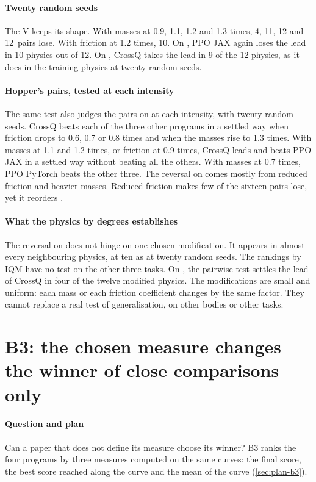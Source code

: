 \paragraph{Twenty random seeds}
The V keeps its shape. With masses at 0.9, 1.1, 1.2 and 1.3 times, 4, 11, 12 and 12~pairs lose. With friction
at 1.2 times, 10. On , PPO JAX again loses the lead in 10 physics out of 12. On
, CrossQ takes the lead in 9 of the 12 physics, as it does in the training physics at twenty
random seeds.

\paragraph{Hopper's pairs, tested at each intensity}
The same test also judges the pairs on  at each intensity, with twenty random seeds. CrossQ
beats each of the three other programs in a
settled way when friction drops to 0.6, 0.7 or 0.8 times and when the masses rise to 1.3 times. With masses at
1.1 and 1.2 times, or friction at 0.9 times, CrossQ leads and beats PPO JAX in a settled way without beating
all the others. With masses at 0.7 times, PPO PyTorch beats the other three. The reversal on 
comes mostly from reduced friction and heavier masses. Reduced friction makes few of the sixteen pairs lose,
yet it reorders .

\paragraph{What the physics by degrees establishes}
The reversal on  does not hinge on one chosen modification. It appears in almost every
neighbouring physics, at ten as at twenty random seeds. The rankings by IQM have no test on the other three
tasks. On , the pairwise test settles the lead of CrossQ in four of the twelve modified physics.
The modifications are small and uniform: each mass or each friction coefficient changes by the same factor.
They cannot replace a real test of generalisation, on other bodies or other tasks.

\section{B3: the chosen measure changes the winner of close comparisons only}\label{sec:b3}

\paragraph{Question and plan}
Can a paper that does not define its measure choose its winner? B3 ranks the four programs by three measures
computed on the same curves: the final score, the best score reached along the curve and the mean of the curve
(\cref{sec:plan-b3}).


